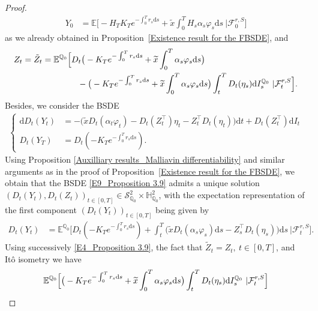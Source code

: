 \documentclass[12,reqno]{amsart}
\numberwithin{equation}{section}
\begin{document}
\begin{proof}
\begin{align}
		Y_{0}&=\mathbb{E}\Big[-H_{T}K_{T}e^{-\int_{0}^{T}r_{s}\mathrm{d}s}+\widetilde{x}\int_{0}^{T}H_{s}\alpha_{s}\varphi_{s}\mathrm{d}s~\big|\mathcal{F}_{0}^{r,S}\Big]
	\end{align}
	as we already obtained in Proposition~\ref{Existence result for the FBSDE}, and
	\begin{align}\label{E8_Proposition 3.9}
		Z_{t}=\tilde{Z}_{t}&=\mathbb{E}^{\mathbb{Q}_{0}}\Big[D_{t}\big(-K_{T}e^{-\int_{0}^{T}r_{s}\mathrm{d}s}+\widetilde{x}\int_{0}^{T}\alpha_{s}\varphi_{s}\mathrm{d}s\big)\notag\\
		&\phantom{XXXXx}-\big(-K_{T}e^{-\int_{0}^{T}r_{s}\mathrm{d}s}+\widetilde{x}\int_{0}^{T}\alpha_{s}\varphi_{s}\mathrm{d}s\big)\int_{t}^{T}D_{t}(\eta_{s})\mathrm{d}I_{s}^{\mathbb{Q}_{0}}~|\mathcal{F}_{t}^{r,S}\Big].
	\end{align}
	Besides, we consider the BSDE 
	\begin{align}\label{E9_Proposition 3.9}
		\begin{cases}
			\mathrm{d}D_{t}(Y_{t})&=-\big(\widetilde{x}D_{t}(\alpha_{t}\varphi_{t})-D_{t}(Z_{t}^{\top})\eta_{t}-Z_{t}^{\top}D_{t}(\eta_{t})\big)\mathrm{d}t+D_{t}(Z_{t}^{\top})\mathrm{d}I_{t}\\
			D_{t}(Y_{T})&=D_{t}(-K_{T}e^{-\int_{0}^{T}r_{s}\mathrm{d}s}).
		\end{cases}
	\end{align}
	Using Proposition \ref{Auxilliary results_Malliavin differentiability} and similar arguments as in the proof of Proposition~\ref{Existence result for the FBSDE}, we obtain that the BSDE \eqref{E9_Proposition 3.9} admits a unique solution $(D_{t}(Y_{t}),D_{t}(Z_{t}))_{t\in[0,T]}\in\mathcal{S}_{\mathbb{Q}_{0}}^{2}\times\mathbb{H}_{\mathbb{Q}_{0}}^{2}$, with the expectation representation of the first component $(D_{t}(Y_{t}))_{t\in[0,T]}$ being given by
	{\small
		\begin{align}\label{E10_Proposition 3.9}
			D_{t}(Y_{t})&=\mathbb{E}^{\mathbb{Q}_{0}}\Big[D_{t}(-K_{T}e^{-\int_{0}^{T}r_{s}\mathrm{d}s})+\int_{t}^{T}\Big(\widetilde{x}D_{t}(\alpha_{s}\varphi_{s})\mathrm{d}s-Z_{s}^{\top}D_{t}(\eta_{s})\Big)\mathrm{d}s~|\mathcal{F}_{t}^{r,S}\Big].
	\end{align}}
	Using successively \eqref{E4_Proposition 3.9}, the fact that $\tilde{Z}_{t}=Z_{t},~t\in[0,T]$, and It{\^o} isometry we have
	\begin{align}\label{E11_Proposition 3.9}
		&\mathbb{E}^{\mathbb{Q}_{0}}\Big[\big(-K_{T}e^{-\int_{0}^{T}r_{s}\mathrm{d}s}+\widetilde{x}\int_{0}^{T}\alpha_{s}\varphi_{s}\mathrm{d}s\big)\int_{t}^{T}D_{t}(\eta_{s})\mathrm{d}I_{s}^{\mathbb{Q}_{0}}~|\mathcal{F}_{t}^{r,S}\Big]\notag\\

\end{align}
\end{proof}
\end{document}
